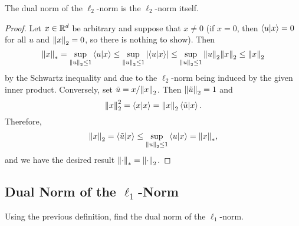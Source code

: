         \begin{solution}
            The dual norm of the \(\ell_2\)-norm is the \(\ell_2\)-norm itself.
            \begin{proof}
                Let \(x \in \mathbb{R}^d\) be arbitrary and suppose that \(x \neq 0\) (if \(x = 0\), then \(\ip{u}{x} = 0\) for all \(u\) and \(\norm{x}_2 = 0\), so there is nothing to show). Then
                \begin{equation}
                    \norm{x}_\ast
                        = \sup_{\norm{u}_2 \leq 1} \ip{u}{x}
                        \leq \sup_{\norm{u}_2 \leq 1} \abs{\ip{u}{x}}
                        \leq \sup_{\norm{u}_2 \leq 1} \norm{u}_2 \norm{x}_2
                        \leq \norm{x}_2
                \end{equation}
                by the Schwartz inequality and due to the \(\ell_2\)-norm being induced by the given inner product. Conversely, set \(\tilde{u} = x / \norm{x}_2\). Then \(\norm{\tilde{u}}_2 = 1\) and
                \begin{equation}
                    \norm{x}_2^2
                        = \ip{x}{x}
                        = \norm{x}_2 \ip{\tilde{u}}{x}.
                \end{equation}
                Therefore,
                \begin{equation}
                    \norm{x}_2
                        = \ip{\tilde{u}}{x}
                        \leq \sup_{\norm{u}_2 \leq 1} \ip{u}{x}
                        = \norm{x}_\ast,
                \end{equation}
                and we have the desired result \(\norm{\cdot}_\ast = \norm{\cdot}_2\).
            \end{proof}
        \end{solution}

    \subsection{Dual Norm of the \texorpdfstring{\(\ell_1\)}{l1}-Norm}
        Using the previous definition, find the dual norm of the \(\ell_1\)-norm.

